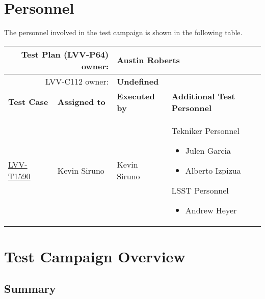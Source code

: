 \documentclass[SE,lsstdraft,STR,toc]{lsstdoc}
\providecommand{\tightlist}{
  \setlength{\itemsep}{0pt}\setlength{\parskip}{0pt}}
\begin{document}
\newpage
\section{Personnel}
\label{sect:personnel}

The personnel involved in the test campaign is shown in the following table.

\begin{longtable}{p{3cm}p{3cm}p{3cm}p{6cm}}
\hline
\multicolumn{2}{r}{Test Plan (LVV-P64) owner:} &
\multicolumn{2}{l}{\textbf{ Austin Roberts } }\\\hline
\multicolumn{2}{r}{ LVV-C112 owner:} &
\multicolumn{2}{l}{\textbf{
    Undefined
}
} \\\hline
\textbf{Test Case} & \textbf{Assigned to} & \textbf{Executed by} & \textbf{Additional Test Personnel} \\ \hline
\href{https://jira.lsstcorp.org/secure/Tests.jspa#/testCase/LVV-T1590}{LVV-T1590}
& {\small Kevin Siruno } & {\small Kevin Siruno } &
\begin{minipage}[]{6cm}
\smallskip
{\small Tekniker Personnel

\begin{itemize}
\tightlist
\item
  Julen Garcia
\item
  Alberto Izpizua
\end{itemize}

LSST Personnel

\begin{itemize}
\tightlist
\item
  Andrew Heyer
\end{itemize}
 }
\medskip
\end{minipage}
\\ \hline
\end{longtable}

\newpage

\section{Test Campaign Overview}
\label{sect:overview}

\subsection{Summary}
\label{sect:summarytable}
\end{document}
